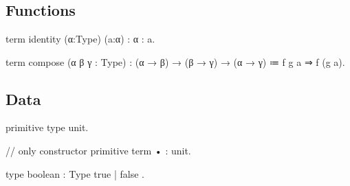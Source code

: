 \section{\LangA}

\subsection{Functions}

\begin{program}
term identity (α:Type) (a:α) : α : a.

term compose (α β γ : Type)
  : (α → β) → (β → γ) → (α → γ)
  ≔ f g a ⇒ f (g a).
\end{program}

\subsection{Data}

\begin{program}[caption={unit}]
primitive type unit.

// only constructor
primitive term • : unit.
\end{program}


\begin{program}[caption={boolean}]
type boolean : Type { true | false }.
\end{program}

\begin{notational}[caption={Notation for conditional}]
if $\mvar{term}_1$ then $\mvar{term}_2$ else $\mvar{term}_3$
  $\syneq$
    cases $\mvar{term}_1$ { true  ⇒ $\mvar{term}_2$
                          | false ⇒ $\mvar{term}_3$
\end{notational}



